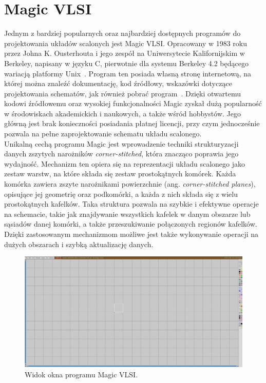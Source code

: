 \section{Magic VLSI}

Jednym z bardziej popularnych oraz najbardziej dostępnych programów do projektowania układów scalonych
jest Magic VLSI\@.
Opracowany w 1983 roku przez Johna K. Ousterhouta i jego zespół na Uniwersytecie Kalifornijskim w Berkeley,
napisany w języku C, pierwotnie dla systemu Berkeley 4.2 będącego wariacją platformy Unix~\cite{MAGIC_article}.
Program ten posiada własną stronę internetową, na której można znaleźć dokumentację, kod źródłowy,
wskazówki dotyczące projektowania schematów, jak również pobrać program~\cite{MAGIC_site}.
Dzięki otwartemu kodowi źródłowemu oraz wysokiej funkcjonalności Magic zyskał dużą popularność
w środowiskach akademickich i naukowych, a także wśród hobbystów.
Jego główną jest brak konieczności posiadania płatnej licencji,
przy czym jednocześnie pozwala na pełne zaprojektowanie schematu układu scalonego.\\
\newpage
\indent Unikalną cechą programu Magic jest wprowadzenie techniki strukturyzacji danych
zszytych narożników \textit{corner-stitched},
która znacząco poprawia jego wydajność.
Mechanizm ten opiera się na reprezentacji układu scalonego jako zestaw warstw,
na które składa się zestaw prostokątnych komórek.
Każda komórka zawiera zszyte narożnikami powierzchnie (ang. \textit{corner-stitched planes}),
opisujące jej geometrię oraz podkomórki, a każda z nich składa się z wielu prostokątnych kafelków.
Taka struktura pozwala na szybkie i efektywne operacje na schemacie,
takie jak znajdywanie wszystkich kafelek w danym obszarze lub sąsiadów danej komórki,
a także przeszukiwanie połączonych regionów kafelków.
Dzięki zastosowanym mechanizmom możliwe jest także wykonywanie operacji na dużych obszarach
i szybką aktualizację danych.

\begin{figure}[h]
    \centering
    \includegraphics[width=\textwidth]{chapters/chapter2/img/magic_okno}
    \caption{Widok okna programu Magic VLSI.}
    \label{fig:magic_okno}
\end{figure}



